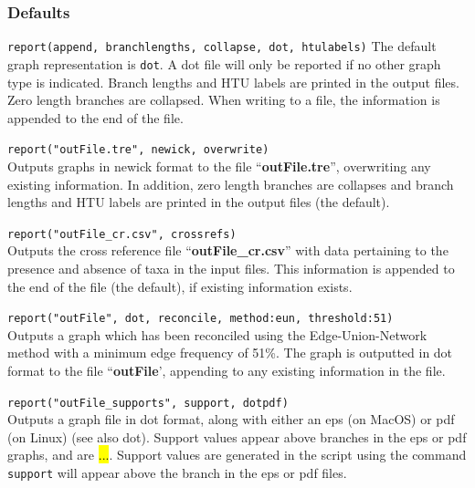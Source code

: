 	\subsubsection{Defaults}
		\texttt{report(append, branchlengths, collapse, dot, htulabels)}
		The default graph representation is \texttt{dot}. A dot file will only be 
		reported if no other graph type is indicated. Branch lengths and HTU 
		labels are printed in the output files. Zero length branches are collapsed. 
		When writing to a file, the information is appended to the end of the file. 
		
	\begin{example}
	
		\item{\texttt{report("outFile.tre", newick, overwrite)}\\ Outputs graphs in newick 
		format to the file ``\textbf{outFile.tre}'', overwriting any existing information.
		In addition, zero length branches are collapses and branch lengths and HTU 
		labels are printed in the output files (the default).}
		
		\item{\texttt{report("outFile\_cr.csv", crossrefs)}\\ Outputs the cross reference file 
		``\textbf{outFile\_cr.csv}'' with data pertaining to the presence and absence of 
		taxa in the input files. This information is appended to the end of the file (the 
		default), if existing information exists.}
		
		\item{\texttt{report("outFile", dot, reconcile, method:eun, threshold:51)}\\ Outputs a
		graph which has been reconciled using the Edge-Union-Network method with a 
		minimum edge frequency of 51\%. The graph is outputted in dot format to the 
		file ``\textbf{outFile}', appending to any existing information in the file.}
		
		\item{\texttt{report("outFile\_supports", support, dotpdf)}\\ Outputs a graph file in 
		dot format, along with either an eps (on MacOS) or pdf (on Linux) (see also dot). 
		Support values appear above branches in the eps or pdf graphs, and are \hl{...}.
		Support values are generated in the script using the command \texttt{support}
		will appear above the branch in the eps or pdf files.}
		
	\end{example}
		
